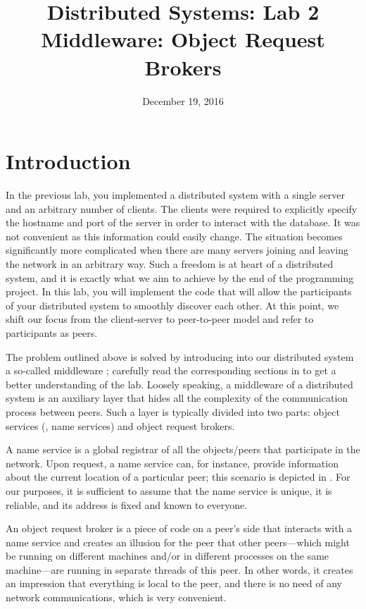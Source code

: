 \documentclass[a4paper]{article}
\title{Distributed Systems: Lab 2\\Middleware: Object Request Brokers}
\author{}
\date{December 19, 2016}
\begin{document}
\maketitle

\section{Introduction}

In the previous lab, you implemented a distributed system with a single server
and an arbitrary number of clients. The clients were required to explicitly
specify the hostname and port of the server in order to interact with the
database. It was not convenient as this information could easily change. The
situation becomes significantly more complicated when there are many servers
joining and leaving the network in an arbitrary way. Such a freedom is at heart
of a distributed system, and it is exactly what we aim to achieve by the end of
the programming project. In this lab, you will implement the code that will
allow the participants of your distributed system to smoothly discover each
other. At this point, we shift our focus from the client-server to peer-to-peer
model \cite{lecture3} and refer to participants as peers.

The problem outlined above is solved by introducing into our distributed system
a so-called middleware \cite{lecture4}; carefully read the corresponding
sections in \cite{lecture4} to get a better understanding of the lab. Loosely
speaking, a middleware of a distributed system is an auxiliary layer that hides
all the complexity of the communication process between peers. Such a layer is
typically divided into two parts: object services (\eg, name services) and
object request brokers.

A name service is a global registrar of all the objects/peers that participate
in the network. Upon request, a name service can, for instance, provide
information about the current location of a particular peer; this scenario is
depicted in . For our purposes, it is sufficient to assume
that the name service is unique, it is reliable, and its address is fixed and
known to everyone.

An object request broker \cite{lecture4, orb} is a piece of code on a peer's
side that interacts with a name service and creates an illusion for the peer
that other peers---which might be running on different machines and/or in
different processes on the same machine---are running in separate threads of
this peer. In other words, it creates an impression that everything is local to
the peer, and there is no need of any network communications, which is very
convenient.
\end{document}
